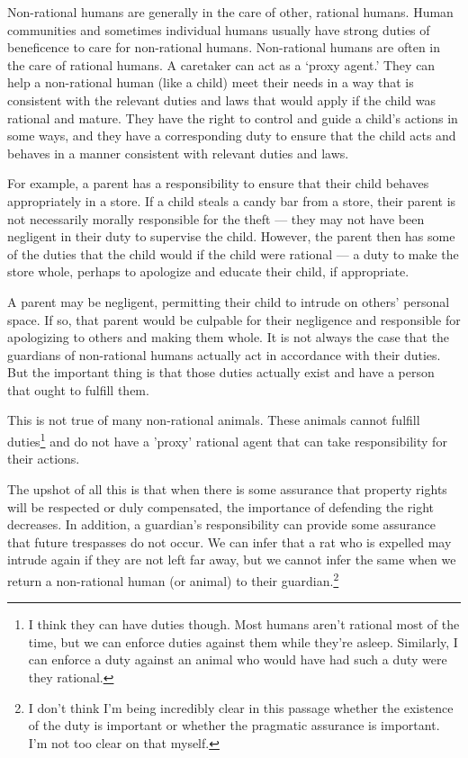 		Non-rational humans are generally in the care of other, rational
		humans. Human communities and sometimes individual humans usually have
		strong duties of beneficence to care for non-rational humans.
		Non-rational humans are often in the care of rational humans. A
		caretaker can act as a ‘proxy agent.’ They can help a non-rational
		human (like a child) meet their needs in a way that is consistent with
		the relevant duties and laws that would apply if the child was rational
		and mature. They have the right to control and guide a child’s actions in
		some ways, and they have a corresponding duty to ensure that the child
		acts and behaves in a manner consistent with relevant duties and laws.

		For example, a parent has a responsibility to ensure that their child
		behaves appropriately in a store.  If a child steals a candy bar from a
		store, their parent is not necessarily morally responsible for the
		theft --- they may not have been negligent in their duty to supervise
		the child. However, the parent then has some of the duties that the
		child would if the child were rational --- a duty to make the store
		whole, perhaps to apologize and educate their child, if appropriate. 

		A parent may be negligent, permitting their child to intrude on
		others' personal space. If so, that parent would be culpable for their
		negligence and responsible for apologizing to others and making them
		whole.  It is not always the case that the guardians of non-rational
		humans actually act in accordance with their duties. But the important
		thing is that those duties actually exist and have a person that ought
		to fulfill them.

		This is not true of many non-rational animals. These animals cannot
		fulfill duties\footnote{I think they can have duties though. Most humans 
		aren't rational most of the time, but we can enforce duties against
		them while they're asleep. Similarly, I can enforce a duty against an animal
		who would have had such a duty were they rational.} and do not have
		a 'proxy' rational agent that can take responsibility for their
		actions.

		The upshot of all this is that when there is some assurance that
		property rights will be respected or duly compensated, the importance
		of defending the right decreases. In addition, a guardian's
		responsibility can provide some assurance that future trespasses do not
		occur. We can infer that a rat who is expelled may intrude again if
		they are not left far away, but we cannot infer the same when we return
		a non-rational human (or animal) to their guardian.\footnote{I don't
		think I'm being incredibly clear in this passage whether the existence
		of the duty is important or whether the pragmatic assurance is important.
		I'm not too clear on that myself.}

